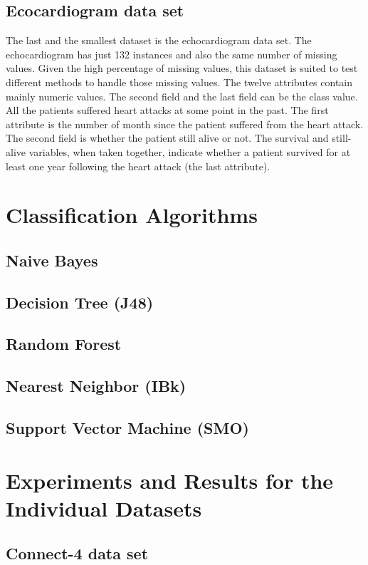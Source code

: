 \documentclass[a4paper]{article}
\begin{document}
\subsection{Ecocardiogram data set}
The last and the smallest dataset is the echocardiogram data set. The
echocardiogram has just 132 instances and also the same number of missing
values. Given the high percentage of
missing values, this dataset is suited to test different methods to handle those
missing values. The twelve attributes contain mainly numeric values. The second
field and the last field can be the class value. All the patients suffered heart
attacks at some point in the past. The first attribute is the number of month
since the patient suffered from the heart attack. 
The second field is whether the patient still
alive or not. The survival and still-alive variables, when taken together,
indicate whether a patient survived for at least one year following the heart
attack (the last attribute). 

\section{Classification Algorithms}
    \subsection{ Naive Bayes}
    \subsection{ Decision Tree (J48)}
    \subsection{ Random Forest}
    \subsection{ Nearest Neighbor (IBk)}
    \subsection{ Support Vector Machine (SMO)}

\section{Experiments and Results for the Individual Datasets}

\subsection{Connect-4 data set}
\end{document}
